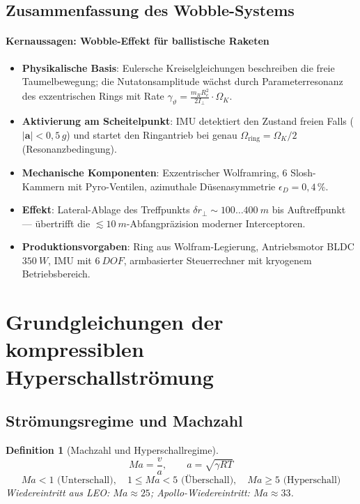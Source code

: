 ﻿\documentclass[12pt,a4paper]{article}
\newtheorem{definition}{Definition}[section]
\newcommand{\vek}[1]{\boldsymbol{#1}}
\newcommand{\Ma}{M\!a}
\begin{document}
\subsection{Zusammenfassung des Wobble-Systems}

\paragraph*{Kernaussagen: Wobble-Effekt für ballistische Raketen}
\begin{itemize}[leftmargin=*]
  \item \textbf{Physikalische Basis}: Eulersche Kreiselgleichungen beschreiben
    die freie Taumelbewegung; die Nutatonsamplitude wächst durch Parameterresonanz
    des exzentrischen Rings mit Rate
    $\gamma_\vartheta = \tfrac{m_R R_e^2}{2I_\perp} \cdot \Omega_K$.
  \item \textbf{Aktivierung am Scheitelpunkt}: IMU detektiert den Zustand freien
    Falls ($|\vek{a}| < 0{,}5\,g$) und startet den Ringantrieb bei genau
    $\Omega_{\mathrm{ring}} = \Omega_K/2$ (Resonanzbedingung).
  \item \textbf{Mechanische Komponenten}: Exzentrischer Wolframring, 6 Slosh-Kammern
    mit Pyro-Ventilen, azimuthale Düsenasymmetrie $\epsilon_D = 0{,}4\,\%$.
  \item \textbf{Effekt}: Lateral-Ablage des Treffpunkts
    $\delta r_\perp \sim 100\ldots\SI{400}{m}$ bis Auftreffpunkt ---
    übertrifft die $\lesssim\SI{10}{m}$-Abfangpräzision moderner Interceptoren.
  \item \textbf{Produktionsvorgaben}: Ring aus Wolfram-Legierung,
    Antriebsmotor BLDC $\SI{350}{W}$, IMU mit $\SI{6}{DOF}$,
    armbasierter Steuerrechner mit kryogenem Betriebsbereich.
\end{itemize}

\section{Grundgleichungen der kompressiblen Hyperschallströmung}

\subsection{Strömungsregime und Machzahl}

\begin{definition}[Machzahl und Hyperschallregime]
\[
  \Ma = \frac{v}{a}, \qquad a = \sqrt{\gamma R T}
\]
\[
  \Ma < 1 \text{ (Unterschall)},\quad
  1 \leq \Ma < 5 \text{ (Überschall)},\quad
  \Ma \geq 5 \text{ (Hyperschall)}
\]
Wiedereintritt aus LEO: $\Ma \approx 25$; Apollo-Wiedereintritt: $\Ma \approx 33$.
\end{definition}
\end{document}
